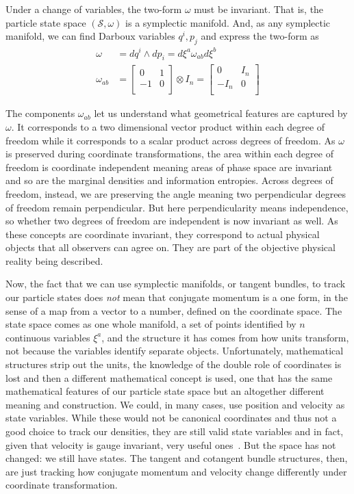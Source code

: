 \documentclass[11pt]{elsarticle}
\begin{document}
Under a change of variables, the two-form $\omega$ must be invariant. That is, the particle state space $(\mathcal{S}, \omega)$ is a symplectic manifold. And, as any symplectic manifold, we can find Darboux variables $q^i, p_j$ and express the two-form as
\begin{equation}
\label{Symplectic}
\begin{aligned}
\omega &= dq^i \wedge dp_i = d\xi^a\omega_{ab}d\xi^b \\
\omega_{ab} &=  \left[
\begin{array}{cc}
0 & 1 \\
-1 & 0 \\
\end{array}
\right] \otimes I_n =
\left[
\begin{array}{cc}
0 & I_n \\
-I_n & 0 \\
\end{array}
\right]
\end{aligned}
\end{equation}

The components $\omega_{ab}$ let us understand what geometrical features are captured by $\omega$. It corresponds to a two dimensional vector product within each degree of freedom while it corresponds to a scalar product across degrees of freedom. As $\omega$ is preserved during coordinate transformations, the area within each degree of freedom is coordinate independent meaning areas of phase space are invariant and so are the marginal densities and information entropies. Across degrees of freedom, instead, we are preserving the angle meaning two perpendicular degrees of freedom remain perpendicular. But here perpendicularity means independence, so whether two degrees of freedom are independent is now invariant as well. As these concepts are coordinate invariant, they correspond to actual physical objects that all observers can agree on. They are part of the objective physical reality being described.

Now, the fact that we can use symplectic manifolds, or tangent bundles, to track our particle states does \emph{not} mean that conjugate momentum is a one form, in the sense of a map from a vector to a number, defined on the coordinate space. The state space comes as one whole manifold, a set of points identified by $n$ continuous variables $\xi^a$, and the structure it has comes from how units transform, not because the variables identify separate objects. Unfortunately, mathematical structures strip out the units, the knowledge of the double role of coordinates is lost and then a different mathematical concept is used, one that has the same mathematical features of our particle state space but an altogether different meaning and construction. We could, in many cases, use position and velocity as state variables. While these would not be canonical coordinates and thus not a good choice to track our densities, they are still valid state variables and in fact, given that velocity is gauge invariant, very useful ones~\cite{Holten}. But the space has not changed: we still have states. The tangent and cotangent bundle structures, then, are just tracking how conjugate momentum and velocity change differently under coordinate transformation.
\end{document}
